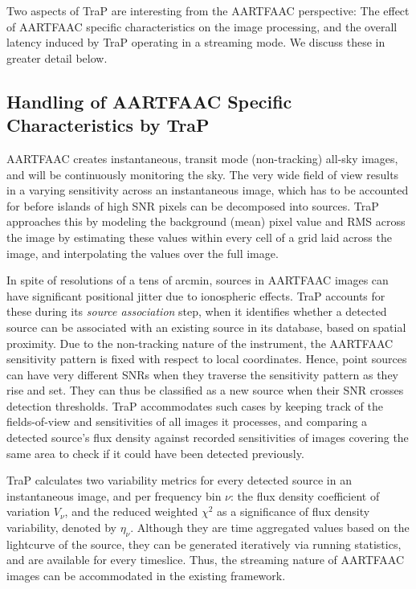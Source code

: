 \documentclass{ws-jai}
\begin{document}
Two aspects of TraP are interesting from the AARTFAAC perspective: The effect of
AARTFAAC  specific characteristics  on  the image  processing,  and the  overall
latency  induced by  TraP operating  in a  streaming mode.  We discuss  these in
greater detail below.\\

\subsection  {Handling of  AARTFAAC  Specific  Characteristics by  TraP}
AARTFAAC creates instantaneous, transit  mode (non-tracking) all-sky images, and
will be continuously monitoring the sky. The  very wide field of view results in
a varying sensitivity  across an instantaneous image, which has  to be accounted
for before  islands of  high SNR  pixels can be  decomposed into  sources.  TraP
approaches this by modeling the background (mean) pixel value and RMS across the
image by  estimating these values  within every cell of  a grid laid  across the
image, and interpolating the values over the full image.

In spite of resolutions of a tens of arcmin, sources in AARTFAAC images can have
significant positional  jitter due  to ionospheric  effects.  TraP  accounts for
these during its \textit{source association}  step, when it identifies whether a
detected source can be associated with an existing source in its database, based
on spatial  proximity.  Due to  the non-tracking  nature of the  instrument, the
AARTFAAC sensitivity pattern is fixed  with respect to local coordinates. Hence,
point sources  can have very different  SNRs when they traverse  the sensitivity
pattern as they rise and set.  They can  thus be classified as a new source when
their SNR crosses detection thresholds.  TraP accommodates such cases by keeping
track of  the fields-of-view and sensitivities  of all images it  processes, and
comparing a  detected source's  flux density  against recorded  sensitivities of
images  covering  the  same  area  to  check if  it  could  have  been  detected
previously.

TraP  calculates  two  variability  metrics  for every  detected  source  in  an
instantaneous image, and  per frequency bin $\nu$: the  flux density coefficient
of variation $V_{\nu}$,  and the reduced weighted $\chi^2$ as  a significance of
flux  density  variability, denoted  by  $\eta_{\nu}$.  Although they  are  time
aggregated values based  on the lightcurve of the source,  they can be generated
iteratively  via running  statistics,  and are  available  for every  timeslice.
Thus,  the streaming  nature  of  AARTFAAC images  can  be  accommodated in  the
existing framework.
\end{document}
